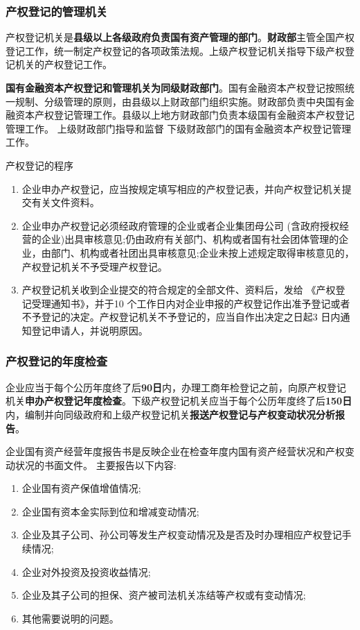 \documentclass[UTF8,12pt]{ctexart}
\numberwithin{equation}{section} %
\numberwithin{figure}{section}
\numberwithin{table}{section}
\begin{document}
	
	\subsubsection{产权登记的管理机关}
	产权登记机关是\textbf{县级以上各级政府负责国有资产管理的部门}。\textbf{财政部}主管全国产权登记工作，统一制定产权登记的各项政策法规。上级产权登记机关指导下级产权登记机关的产权登记工作。
	
	\textbf{国有金融资本产权登记和管理机关为同级财政部门}。国有金融资本产权登记按照统 一规制、分级管理的原则，由县级以上财政部门组织实施。财政部负责中央国有金融资本产权登记管理工作。县级以上地方财政部门负责本级国有金融资本产权登记管理工作。 上级财政部门指导和监督 下级财政部门的国有金融资本产权登记管理工作。
	
	产权登记的程序
	\begin{enumerate}
		\item 企业申办产权登记，应当按规定填写相应的产权登记表，并向产权登记机关提交有关文件资料。
		
		\item 企业申办产权登记必须经政府管理的企业或者企业集团母公司 (含政府授权经营的企业)出具审核意见;仍由政府有关部门、机构或者国有社会团体管理的企业，由部门、机构或者社团出具审核意见;企业未按上述规定取得审核意见的，产权登记机关不予受理产权登记。
		
		\item 产权登记机关收到企业提交的符合规定的全部文件、资料后，发给 《产权登记受理通知书》，并于10 个工作日内对企业申报的产权登记作出准予登记或者不予登记的决定。产权登记机关不予登记的，应当自作出决定之日起3 日内通知登记申请人，并说明原因。
	\end{enumerate}
	
	
	\subsubsection{产权登记的年度检查}
	企业应当于每个公历年度终了后\textbf{90日}内，办理工商年检登记之前，向原产权登记机关\textbf{申办产权登记年度检查}。下级产权登记机关应当于每个公历年度终了后\textbf{150日}内，编制并向同级政府和上级产权登记机关\textbf{报送产权登记与产权变动状况分析报告}。
	
	企业国有资产经营年度报告书是反映企业在检查年度内国有资产经营状况和产权变动状况的书面文件。 主要报告以下内容:
	\begin{enumerate}
		\item 企业国有资产保值增值情况;
		
		\item 企业国有资本金实际到位和增减变动情况;
		
		\item 企业及其子公司、孙公司等发生产权变动情况及是否及时办理相应产权登记手续情况;
		
		\item 企业对外投资及投资收益情况;
		
		\item 企业及其子公司的担保、资产被司法机关冻结等产权或有变动情况;
		
		\item 其他需要说明的问题。
	\end{enumerate}
	
\end{document}
